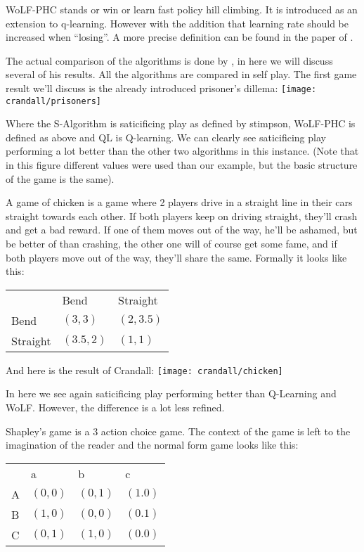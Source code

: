 WoLF-PHC stands or win or learn fast policy hill climbing. It is 
introduced as an extension to q-learning. However with the addition that
learning rate should be increased when ``losing''. A more precise definition
can be found in the paper of \citep{bowling}.

The actual comparison of the algorithms is done by \citep{crandall}, in here
we will discuss several of his results. All the algorithms are compared in self
play. 
The first game result we'll discuss
is the already introduced prisoner's dillema:
\texttt{[image: crandall/prisoners]}

Where the S-Algorithm is saticificing play as defined by stimpson, WoLF-PHC is
defined as above and QL is Q-learning. We can clearly see saticificing play
performing a lot better than the other two algorithms in this instance.
(Note that in this figure different values were used than our example, but
the basic structure of the game is the same).

A game of chicken is a game where 2 players drive in a straight line in their
cars straight towards each other. If both players keep on driving straight,
they'll crash and get a bad reward. If one of them moves out of the way, he'll
be ashamed, but be better of than crashing, the other one will of course get
some fame, and if both players move out of the way, they'll share the same.
Formally it looks like this:

\begin{tabular}{lll}
              & Bend & Straight \\
    Bend & $(3,3)$     & $(2,3.5)$  \\
    Straight & $(3.5,2)$     & $(1,1)$  \\
\end{tabular}

And here is the result of Crandall:
\texttt{[image: crandall/chicken]}

In here we see again saticificing play performing better than Q-Learning and
WoLF. However, the difference is a lot less refined.

Shapley's game is a 3 action choice game. The context of the game is left to
the imagination of the reader and the normal form game looks like this:

\begin{tabular}{llll}
              & a & b & c \\
    A & $(0,0)$ & $(0,1)$     & $(1.0)$  \\
    B & $(1,0)$ & $(0,0)$     & $(0.1)$  \\
    C & $(0,1)$ & $(1,0)$     & $(0.0)$  \\
\end{tabular}

